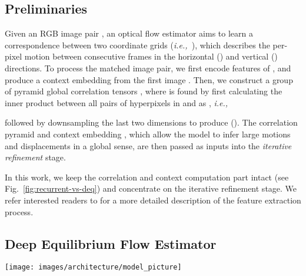 \documentclass[10pt,twocolumn,letterpaper]{article}
\def\ie{\textit{i.e.,~}}
\begin{document}
\subsection{Preliminaries}
\label{subsec:preliminaries}

Given an RGB image pair , an optical flow estimator aims to learn a correspondence  between two coordinate grids  (\ie ), which describes the per-pixel motion between consecutive frames in the horizontal () and vertical () directions. To process the matched image pair, we first encode features  of , and produce a context embedding  from the first image . Then, we construct a group of pyramid global correlation tensors , where  is found by first calculating the inner product between all pairs of hyperpixels in  and  as , \ie

followed by downsampling the last two dimensions to produce  (). The correlation pyramid  and context embedding , which allow the model to infer large motions and displacements in a global sense, are then passed as inputs into the \emph{iterative refinement} stage. 

In this work, we keep the correlation and context computation part intact (see Fig.~\ref{fig:recurrent-vs-deq}) and concentrate on the iterative refinement stage. We refer interested readers to \citet{RAFT} for a more detailed description of the feature extraction process. 

\subsection{Deep Equilibrium Flow Estimator}
\label{subsec:deq-flow-estimator}

\begin{figure*}[t]
\centering
\vspace{-.1cm}
\texttt{[image: images/architecture/model\_picture]}
\caption{A visual comparison of the DEQ flow estimator and the recurrent unrolled flow estimator. After the correlation and context modules (see Sec.~\ref{subsec:preliminaries}), a DEQ flow uses a fast, black-box fixed-point solver (e.g., Anderson) to directly solve for a stable (fixed-point) flow , and differentiate through  with a cheap inexact gradient. This makes a DEQ flow's backward pass almost free. In contrast, a recurrent flow estimator has to be unrolled for many steps, and needs to perform BPTT, which is costly in both computation and memory.}
\vspace{-.4cm}
\label{fig:recurrent-vs-deq}
\end{figure*}
\end{document}
